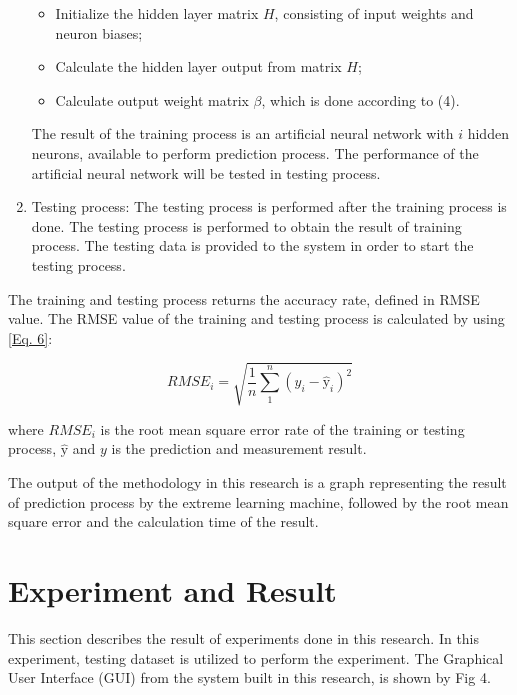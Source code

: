 \documentclass[journal,comsoc]{IEEEtran}
\begin{document}
\begin{enumerate}
\begin{itemize}
\item Initialize the hidden layer matrix $H$, consisting of input weights and neuron biases;
\item Calculate the hidden layer output from matrix $H$;
\item Calculate output weight matrix $\beta$, which is done according to (4).
\end{itemize}

The result of the training process is an artificial neural network with $i$ hidden neurons, available to perform prediction process. The performance of the artificial neural network will be tested in testing process.

\item Testing process: The testing process is performed after the training process is done. The testing process is performed to obtain the result of training process. The testing data is provided to the system in order to start the testing process.

\end{enumerate}

The training and testing process returns the accuracy rate, defined in RMSE value. The RMSE value of the training and testing process is calculated by using \eqref{Eq. 6}:

\begin{equation}
RMSE_{i} = \sqrt{\frac{1}{n} \sum_{1}^{n} (y_i - \hat{\mathrm{y}}_i)^{2}}
	\label{Eq. 6}
\end{equation}

where $RMSE_{i}$ is the root mean square error rate of the training or testing process, $\hat{\mathrm{y}}$  and $y$ is the prediction and measurement result.

The output of the methodology in this research is a graph representing the result of prediction process by the extreme learning machine, followed by the root mean square error and the calculation time of the result.

\section{Experiment and Result}

This section describes the result of experiments done in this research. In this experiment, testing dataset is utilized to perform the experiment. The Graphical User Interface (GUI) from the system built in this research, is shown by Fig 4.
\end{document}
